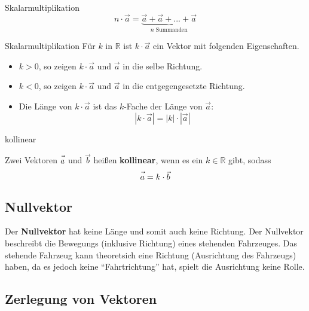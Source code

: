\begin{definition}{Skalarmultiplikation}{}
  $$n\cdot{}\vec{a} = \underbrace{\vec{a} + \vec{a} + ... + \vec{a}}_{n \textrm{ Summanden}}$$
\end{definition}

\begin{definition}{Skalarmultiplikation}{}
  Für $k$ in $\mathbb{R}$ ist $k\cdot{}\vec{a}$ ein Vektor mit
  folgenden Eigenschaften.

  \begin{itemize}
  \item $k>0$, so zeigen $k\cdot{}\vec{a}$ und $\vec{a}$ in die selbe Richtung.
  \item $k<0$, so zeigen $k\cdot{}\vec{a}$ und $\vec{a}$ in die entgegengesetzte Richtung.
  \item Die Länge von $k\cdot{}\vec{a}$ ist das $k$-Fache der Länge
    von $\vec{a}$: $$|k\cdot{}\vec{a}| = |k|\cdot{}|\vec{a}|$$
   \end{itemize}
\end{definition}

\begin{definition}{kollinear}{}

  Zwei Vektoren $\vec{a\vphantom{b}}$ und $\vec{b}$ heißen \textbf{kollinear}, wenn es ein
  $k\in\mathbb{R}$ gibt, sodass
  $$\vec{a\vphantom{b}} = k\cdot{}\vec{b}$$
  \end{definition}

\newpage


\subsection{Nullvektor}

Der \textbf{Nullvektor} hat keine Länge und somit auch keine
Richtung. Der Nullvektor beschreibt \zB die Bewegungs (inklusive
Richtung) eines stehenden Fahrzeuges.
Das stehende Fahrzeug kann theoretsich eine Richtung (Ausrichtung des
Fahrzeugs) haben, da es jedoch keine ``Fahrtrichtung'' hat, spielt die
Ausrichtung keine Rolle.

\newpage

\subsection{Zerlegung von Vektoren}

